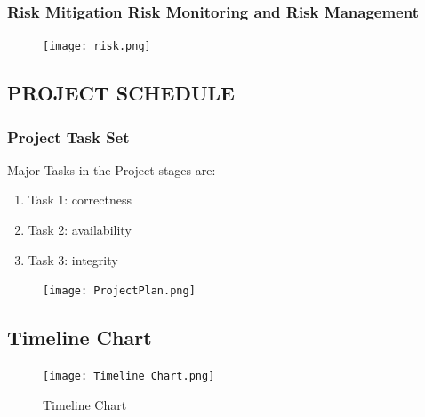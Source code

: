 \documentclass[12pt]{report}
\begin{document}
\subsubsection{Risk Mitigation Risk Monitoring and Risk Management}
\justifying
\setlength{\parindent}{4em}
\setlength{\parskip}{0.5em}
\renewcommand{\baselinestretch}{1.5}

\normalsize
\vspace{1cm}
\begin{figure}[h]
\centering
\texttt{[image: risk.png]}

\end{figure}
\vspace{14cm}
\subsection{PROJECT SCHEDULE}

\justifying
\setlength{\parindent}{4em}
\setlength{\parskip}{0.5em}
\renewcommand{\baselinestretch}{1.5}
\subsubsection{Project Task Set}
\normalsize
Major Tasks in the Project stages are:
\begin{enumerate}
\item Task 1: correctness
\item Task 2: availability
\item Task 3: integrity
\end{enumerate}
\vspace{0.1cm}
\begin{figure}[h]
\centering
\texttt{[image: ProjectPlan.png]}

\end{figure}

\vspace{14cm}
\subsection{Timeline Chart}
\justifying
\setlength{\parindent}{4em}
\setlength{\parskip}{0.5em}
\renewcommand{\baselinestretch}{1.5}

\vspace{1cm}
\begin{figure}[h]
\centering
\texttt{[image: Timeline Chart.png]}
\caption{Timeline Chart}
\label{Timeline Chart}

\end{figure}
\end{document}
